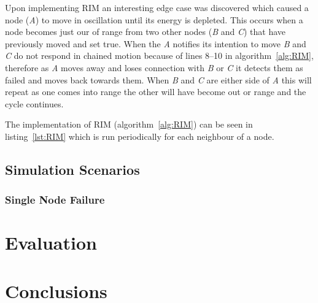 \documentclass[authoryearcitations]{UoYCSproject}
\newlength{\gobble}
\begin{document}
Upon implementing RIM an interesting edge case was discovered which caused a node (\emph{A}) to move in oscillation until its energy is depleted. This occurs when a node becomes just our of range from two other nodes (\emph{B} and \emph{C}) that have previously moved and set  true. When the \emph{A} notifies its intention to move \emph{B} and \emph{C} do not respond in chained motion because of lines 8--10 in algorithm~\ref{alg:RIM}, therefore as \emph{A} moves away and loses connection with \emph{B} or \emph{C} it detects them as failed and moves back towards them. When \emph{B} and \emph{C} are either side of \emph{A} this will repeat as one comes into range the other will have become out or range and the cycle continues.



The implementation of RIM (algorithm~\ref{alg:RIM}) can be seen in listing~\ref{lst:RIM} which is run periodically for each neighbour of a node.


\section{Simulation Scenarios}

\subsection{Single Node Failure}

\chapter{Evaluation}
\label{cha:Eval}

\chapter{Conclusions}
\label{cha:Conclusion}





\end{document}
